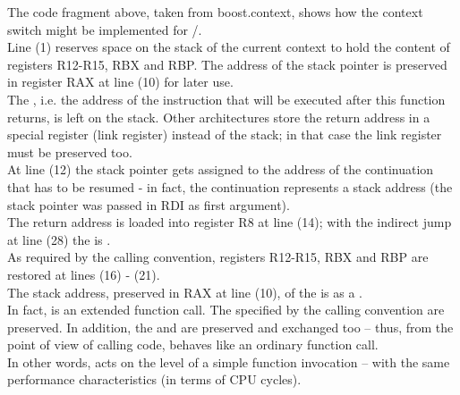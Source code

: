 The code fragment above, taken from boost.context\cite{bcontext}, shows how the
context switch might be implemented for /.\\
Line (1) reserves space on the stack of the current context to hold the content of
registers R12-R15, RBX and RBP. The address of the stack pointer is preserved in
register RAX at line (10) for later use.\\
The , i.e. the address of the instruction that will be
executed after this function returns, is left on the stack. Other architectures
store the return address in a special register (link register) instead of the
stack; in that case the link register must be preserved too.\\
At line (12) the stack pointer gets assigned to the address of the
continuation that has to be resumed - in fact, the continuation represents a
stack address (the stack pointer was passed in RDI as first argument).\\
The return address is loaded into register R8 at line (14); with the indirect
jump at line (28) the  is .\\
As required by the calling convention, registers R12-R15, RBX and RBP are
restored at lines (16) - (21).\\
The stack address, preserved in RAX at line (10), of the
 is  as a .\\

In fact, \cc is an extended function call. The  specified by the calling convention are preserved. In addition, the
 and  are preserved and exchanged
too -- thus, from the point of view of calling code, \cc behaves like an
ordinary function call.\\
In other words, \cc acts on the level of a simple function invocation -- with the
same performance characteristics (in terms of CPU cycles).
